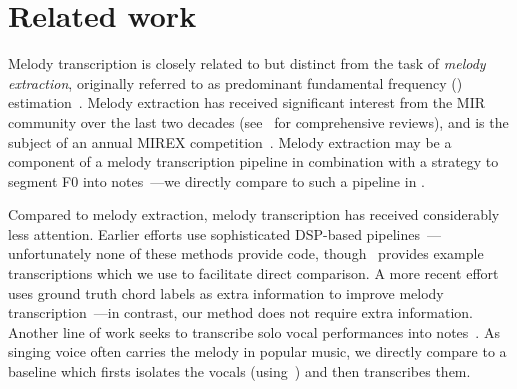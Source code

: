 \section{Related work}\label{sec:related}

Melody transcription is closely related to but distinct from the task of \emph{melody extraction}, originally referred to as predominant fundamental frequency (\fnot) estimation~\cite{goto1999real,goto2004real}. 
Melody extraction has received significant interest from the MIR community over the last two decades (see~\cite{salamon2014melody,rao2022melody} for comprehensive reviews), 
and is the subject of an annual MIREX competition~\cite{downie2014ten}. 
Melody extraction may be a component of a melody transcription pipeline in combination with a strategy to segment F0 
into notes~\cite{salamon2015midi,nishikimi2016musical,nishikimi2017scale}---we directly compare to such a pipeline in .

Compared to melody extraction, melody transcription has received considerably less attention. 
Earlier efforts use sophisticated DSP-based pipelines~\cite{paiva2004auditory,paiva2005detection,ryynanen2008automatic,weil2009automatic}---unfortunately none of these methods provide code, though~\cite{ryynanen2008automatic} provides example transcriptions which we use to facilitate direct comparison. 
A more recent effort uses ground truth chord labels as extra information to improve melody transcription~\cite{laaksonen2014automatic}---in contrast, our method does not require extra information. 
Another line of work seeks to transcribe solo vocal performances into notes~\cite{mauch2015computer,nishikimi2020bayesian,nishikimi2021audio}. 
As singing voice often carries the melody in popular music, we directly compare to a baseline which firsts isolates the vocals (using~\cite{hennequin2020spleeter}) and then transcribes them.

